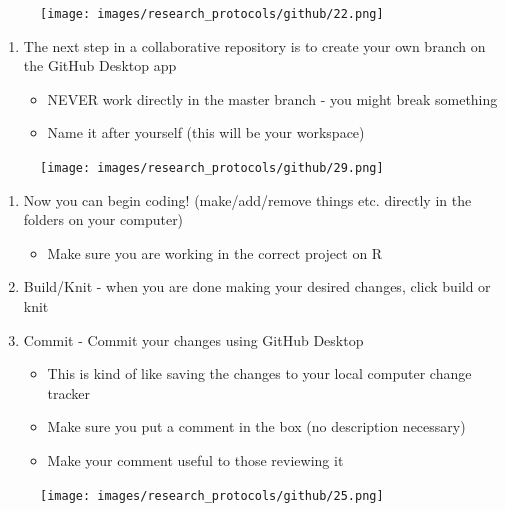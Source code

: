 \documentclass[
]{book}
\providecommand{\tightlist}{%
  \setlength{\itemsep}{0pt}\setlength{\parskip}{0pt}}
\begin{document}
\begin{figure}
\centering
\texttt{[image: images/research\_protocols/github/22.png]}
\caption{}
\end{figure}

\begin{enumerate}
\def\labelenumi{\arabic{enumi}.}
\setcounter{enumi}{1}
\tightlist
\item
  The next step in a collaborative repository is to create your own branch on the GitHub Desktop app

  \begin{itemize}
  \tightlist
  \item
    NEVER work directly in the master branch - you might break something
  \item
    Name it after yourself (this will be your workspace)
  \end{itemize}
\end{enumerate}

\begin{figure}
\centering
\texttt{[image: images/research\_protocols/github/29.png]}
\caption{}
\end{figure}

\begin{enumerate}
\def\labelenumi{\arabic{enumi}.}
\setcounter{enumi}{2}
\item
  Now you can begin coding! (make/add/remove things etc. directly in the folders on your computer)

  \begin{itemize}
  \tightlist
  \item
    Make sure you are working in the correct project on R
  \end{itemize}
\item
  Build/Knit - when you are done making your desired changes, click build or knit
\item
  Commit - Commit your changes using GitHub Desktop

  \begin{itemize}
  \tightlist
  \item
    This is kind of like saving the changes to your local computer change tracker
  \item
    Make sure you put a comment in the box (no description necessary)
  \item
    Make your comment useful to those reviewing it
  \end{itemize}
\end{enumerate}

\begin{figure}
\centering
\texttt{[image: images/research\_protocols/github/25.png]}
\caption{}
\end{figure}
\end{document}
